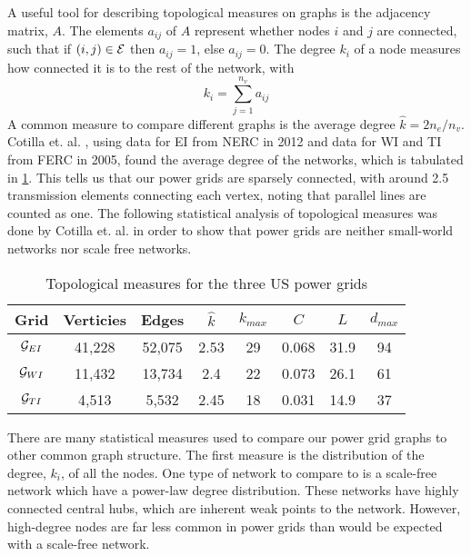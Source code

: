 A useful tool for describing topological measures on graphs is the adjacency matrix, $A$.  The elements $a_{ij}$ of $A$ represent whether nodes $i$ and $j$ are connected, such that if $(i,j) \in \mathcal{E}$ then $a_{ij} = 1$, else $a_{ij}=0$.  The degree $k_i$ of a node measures how connected it is to the rest of the network, with
\begin{equation}
k_i = \sum_{j=1}^{n_v} a_{ij}
\end{equation}
A common measure to compare different graphs is the average degree $\hat{k} = 2 n_e/n_v$.  Cotilla et. al. \cite{cotilla_2012}, using data for EI from NERC in 2012 and data for WI and TI from FERC in 2005, found the average degree of the networks, which is tabulated in \ref{tab:topo_info}.  This tells us that our power grids are sparsely connected, with around 2.5 transmission elements connecting each vertex, noting that parallel lines are counted as one.  The following statistical analysis of topological measures was done by Cotilla et. al. \cite{cotilla_2012} in order to show that power grids are neither small-world networks nor scale free networks.

\begin{table}
\centering
\begin{tabular}{| c | c c c c c c c|}
\hline
Grid & Verticies & Edges & $\hat{k}$  &  $k_{max}$ & $C$ & $L$ & $d_{max}$ \\
\hline
$\mathcal{G}_{EI}$	& 41,228	&	52,075	&	2.53	&	29	&	0.068	&	31.9	&	94	\\
$\mathcal{G}_{WI}$	& 11,432	&	13,734	&	2.4	&	22	&	0.073	&	26.1	&	61	\\
$\mathcal{G}_{TI}$ 	& 4,513	&	5,532		&	2.45	&	18	&	0.031	&	14.9	&	37	\\
\hline
\end{tabular}
\caption{Topological measures for the three US power grids}
\label{tab:topo_info}
\end{table}


There are many statistical measures used to compare our power grid graphs to other common graph structure.  The first measure is the distribution of the degree, $k_i$, of all the nodes.  One type of network to compare to is a scale-free network which have a power-law degree distribution.  These networks have highly connected central hubs, which are inherent weak points to the network.  However, high-degree nodes are far less common in power grids than would be expected with a scale-free network.    

